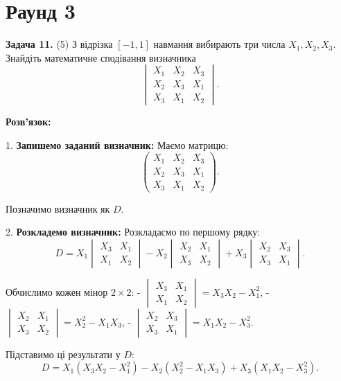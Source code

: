 \documentclass{article}
\begin{document}
\section*{\centering \textbf{Раунд 3}}

\noindent\textbf{Задача 11.} (5) З відрізка \([-1, 1]\) навмання вибирають три числа \(X_1, X_2, X_3\). Знайдіть математичне сподівання визначника
\[
\begin{vmatrix}
X_1 & X_2 & X_3 \\
X_2 & X_3 & X_1 \\
X_3 & X_1 & X_2
\end{vmatrix}.
\]


\textbf{Розв’язок:}

1. \textbf{Запишемо заданий визначник:}  
   Маємо матрицю:
   \[
   \begin{pmatrix}
   X_1 & X_2 & X_3 \\
   X_2 & X_3 & X_1 \\
   X_3 & X_1 & X_2
   \end{pmatrix}.
   \]

   Позначимо визначник як \(D\).

2. \textbf{Розкладемо визначник:}  
   Розкладаємо по першому рядку:
   \[
   D = X_1 
   \begin{vmatrix}
   X_3 & X_1 \\
   X_1 & X_2
   \end{vmatrix}
   - X_2 
   \begin{vmatrix}
   X_2 & X_1 \\
   X_3 & X_2
   \end{vmatrix}
   + X_3
   \begin{vmatrix}
   X_2 & X_3 \\
   X_3 & X_1
   \end{vmatrix}.
   \]

   Обчислимо кожен мінор \(2 \times 2\):
   - \(\begin{vmatrix} X_3 & X_1 \\ X_1 & X_2 \end{vmatrix} = X_3X_2 - X_1^2\),
   - \(\begin{vmatrix} X_2 & X_1 \\ X_3 & X_2 \end{vmatrix} = X_2^2 - X_1X_3\),
   - \(\begin{vmatrix} X_2 & X_3 \\ X_3 & X_1 \end{vmatrix} = X_1X_2 - X_3^2\).

   Підставимо ці результати у \(D\):
   \[
   D = X_1(X_3X_2 - X_1^2) - X_2(X_2^2 - X_1X_3) + X_3(X_1X_2 - X_3^2).
   \]
\end{document}
